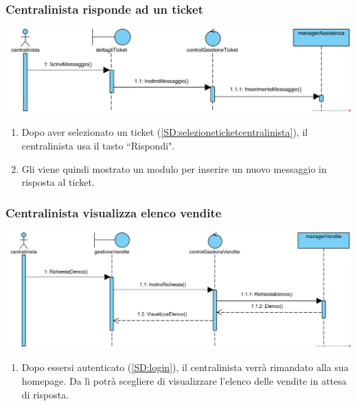 \documentclass[12pt,a4paper]{article}
\begin{document}
\subsubsection{Centralinista risponde ad un ticket}
\label{SD:rispostaticketcentralinista}

\begin{center}
\includegraphics[width=\textwidth]{SequenceDiagram/CentralinistaRispondeTicket}
\end{center}

\begin{enumerate}
\item Dopo aver selezionato un ticket (\ref{SD:selezioneticketcentralinista}), il centralinista usa il tasto ``Rispondi".
\item Gli viene quindi mostrato un modulo per inserire un nuovo messaggio in risposta al ticket.
\end{enumerate}

\subsubsection{Centralinista visualizza elenco vendite}
\label{SD:elencovenditecentralinista}

\begin{center}
\includegraphics[width=\textwidth]{SequenceDiagram/CentralinistaApreElencoVendite}
\end{center}

\begin{enumerate}
\item Dopo essersi autenticato (\ref{SD:login}), il centralinista verrà rimandato alla sua homepage. Da lì potrà scegliere di visualizzare l'elenco delle vendite in attesa di risposta.
\end{enumerate}
\end{document}
